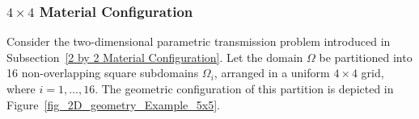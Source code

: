 \documentclass[oneside]{article}
\begin{document}

\subsubsection{$4 \times 4$ Material Configuration}\label{4 by 4 Material Configuration}

Consider the two-dimensional parametric transmission problem introduced in Subsection~\ref{2 by 2 Material Configuration}. Let the domain \( \Omega \) be partitioned into 16 non-overlapping square subdomains \( \Omega_i \), arranged in a uniform \( 4 \times 4 \) grid, where \( i = 1, \ldots, 16 \). The geometric configuration of this partition is depicted in Figure~\ref{fig_2D_geometry_Example_5x5}.
\end{document}

